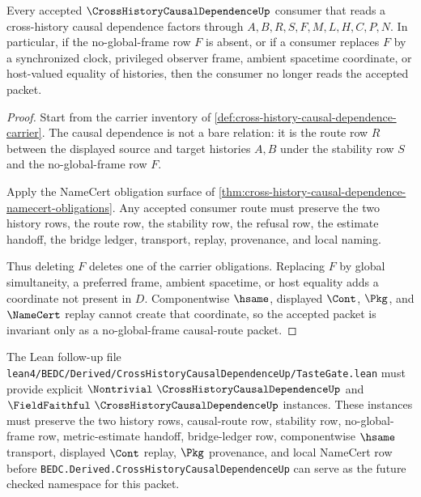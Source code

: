 \begin{theorem}
\label{thm:cross-history-causal-dependence-nonframe-invariance}
Every accepted $\CrossHistoryCausalDependenceUp$ consumer that reads a cross-history causal dependence factors through $A,B,R,S,F,M,L,H,C,P,N$. In particular, if the no-global-frame row $F$ is absent, or if a consumer replaces $F$ by a synchronized clock, privileged observer frame, ambient spacetime coordinate, or host-valued equality of histories, then the consumer no longer reads the accepted packet.
\end{theorem}
\begin{proof}
Start from the carrier inventory of \autoref{def:cross-history-causal-dependence-carrier}. The causal dependence is not a bare relation: it is the route row $R$ between the displayed source and target histories $A,B$ under the stability row $S$ and the no-global-frame row $F$.

Apply the NameCert obligation surface of \autoref{thm:cross-history-causal-dependence-namecert-obligations}. Any accepted consumer route must preserve the two history rows, the route row, the stability row, the refusal row, the estimate handoff, the bridge ledger, transport, replay, provenance, and local naming.

Thus deleting $F$ deletes one of the carrier obligations. Replacing $F$ by global simultaneity, a preferred frame, ambient spacetime, or host equality adds a coordinate not present in $D$. Componentwise $\hsame$, displayed $\Cont$, $\Pkg$, and $\NameCert$ replay cannot create that coordinate, so the accepted packet is invariant only as a no-global-frame causal-route packet.
\end{proof}



The Lean follow-up file \texttt{lean4/BEDC/Derived/CrossHistoryCausalDependenceUp/TasteGate.lean} must provide explicit $\Nontrivial\ \CrossHistoryCausalDependenceUp$ and $\FieldFaithful\ \CrossHistoryCausalDependenceUp$ instances. These instances must preserve the two history rows, causal-route row, stability row, no-global-frame row, metric-estimate handoff, bridge-ledger row, componentwise $\hsame$ transport, displayed $\Cont$ replay, $\Pkg$ provenance, and local NameCert row before \texttt{BEDC.Derived.CrossHistoryCausalDependenceUp} can serve as the future checked namespace for this packet.

